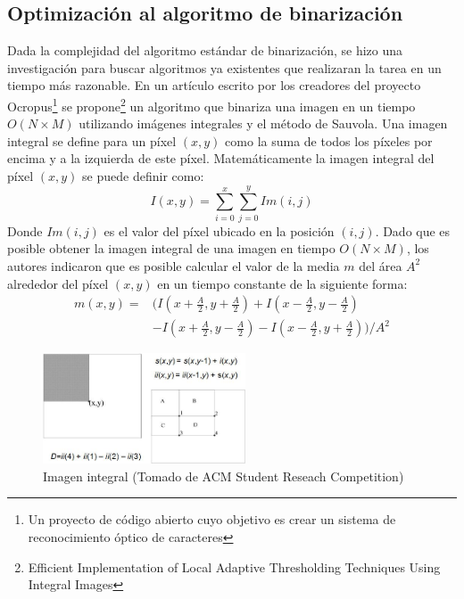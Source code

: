 \documentclass[a4paper, 11pt, oneside]{report}
\begin{document}
\subsection{Optimización al algoritmo de binarización}
Dada la complejidad del algoritmo estándar de binarización, se hizo una investigación para buscar algoritmos ya existentes que realizaran la tarea en un tiempo más razonable. En un artículo escrito por los creadores del proyecto Ocropus\footnote{Un proyecto de código abierto cuyo objetivo es crear un sistema de reconocimiento óptico de caracteres} se propone\footnote{Efficient Implementation of Local Adaptive Thresholding Techniques Using Integral Images} un algoritmo que binariza una imagen en un tiempo $O(N \times M)$ utilizando imágenes integrales y el método de Sauvola. Una imagen integral se define para un píxel $(x, y)$ como la suma de todos los píxeles por encima y a la izquierda de este píxel. Matemáticamente la imagen integral del píxel $(x, y)$ se puede definir como:
\begin{equation}
I(x, y) = \sum_{i=0}^{x}\sum_{j=0}^{y}Im(i, j)
\end{equation}
Donde $Im(i, j)$ es el valor del píxel ubicado en la posición $(i, j)$. Dado que es posible obtener la imagen integral de una imagen en tiempo $O(N \times M)$, los autores indicaron que es posible calcular el valor de la media $m$ del área $A^{2}$ alrededor del píxel $(x, y)$ en un tiempo constante de la siguiente forma:
\begin{align*}
m(x, y) =& (I(x + \frac{A}{2}, y + \frac{A}{2}) + I(x - \frac{A}{2}, y - \frac{A}{2}) \\
&- I(x + \frac{A}{2}, y - \frac{A}{2}) - I(x - \frac{A}{2}, y + \frac{A}{2})) / A^{2}
\end{align*}
\begin{figure}[htb]
\begin{center}
\leavevmode
\includegraphics[width=6cm]{img/integral.png}
\end{center}
\caption{Imagen integral (Tomado de ACM Student Reseach Competition)}
\label{fig:integral}
\end{figure}
\end{document}

